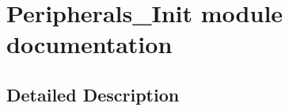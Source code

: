 \hypertarget{group___peripherals___init__module}{}\section{Peripherals\+\_\+\+Init module documentation}
\label{group___peripherals___init__module}


\subsection{Detailed Description}
